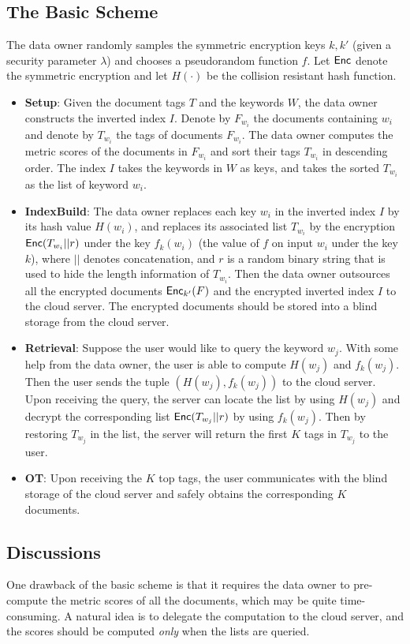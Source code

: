 \documentclass{IEEEtran}
\begin{document}
\subsection{The Basic Scheme}
The data owner randomly samples the symmetric encryption keys $k, k'$ (given a security parameter $\lambda$) and chooses a pseudorandom function $f$. Let $\textsf{Enc}$ denote the symmetric encryption and let $H(\cdot)$ be the collision resistant hash function. 
\begin{itemize}
\item {\bf Setup}: Given the document tags $T$ and the keywords $W$, the data owner constructs the inverted index $I$. Denote by $F_{w_i}$ the documents containing $w_i$ and denote by $T_{w_i}$ the tags of documents $F_{w_i}$. The data owner computes the metric scores of the documents in $F_{w_i}$ and sort their tags $T_{w_i}$ in descending order. The index $I$ takes the keywords in $W$ as keys, and takes the sorted $T_{w_i}$ as the list of keyword $w_i$. 
\item {\bf IndexBuild}: The data owner replaces each key $w_i$ in the inverted index $I$ by its hash value $H(w_i)$, and replaces its associated list $T_{w_i}$ by the encryption $\textsf{Enc}(T_{w_i}||r)$ under the key $f_k(w_i)$ (the value of $f$ on input $w_i$ under the key $k$), where $||$ denotes concatenation, and $r$ is a random binary string that is used to hide the length information of $T_{w_i}$. Then the data owner outsources all the encrypted documents $\textsf{Enc}_{k'}(F)$ and the encrypted inverted index $I$ to the cloud server. The encrypted documents should be stored into a blind storage from the cloud server.
\item {\bf Retrieval}: Suppose the user would like to query the keyword $w_j$. With some help from the data owner, the user is able to compute $H(w_j)$ and $f_k(w_j)$. Then the user sends the tuple $(H(w_j), f_k(w_j))$ to the cloud server. Upon receiving the query, the server can locate the list by using $H(w_j)$ and decrypt the corresponding list $\textsf{Enc}(T_{w_j}||r)$ by using $f_k(w_j)$. Then by restoring $T_{w_j}$ in the list, the server will return the first $K$ tags in $T_{w_j}$ to the user.
\item {\bf OT}: Upon receiving the $K$ top tags, the user communicates with the blind storage of the cloud server and safely obtains the corresponding $K$ documents.
\end{itemize}

\subsection{Discussions}
One drawback of the basic scheme is that it requires the data owner to pre-compute the metric scores of all the documents, which may be quite time-consuming. A natural idea is to delegate the computation to the cloud server, and the scores should be computed \emph{only} when the lists are queried.
\end{document}
